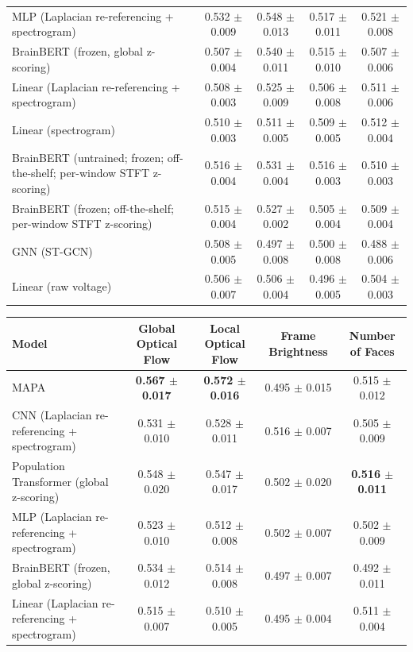 \begin{table}[!htbp]
\begin{tabular}{>{\raggedright\arraybackslash}p{8cm}cccc}
MLP (Laplacian re-referencing + spectrogram) & 0.532 $\pm$ 0.009 & 0.548 $\pm$ 0.013 & 0.517 $\pm$ 0.011 & 0.521 $\pm$ 0.008 \\
BrainBERT (frozen, global z-scoring) & 0.507 $\pm$ 0.004 & 0.540 $\pm$ 0.011 & 0.515 $\pm$ 0.010 & 0.507 $\pm$ 0.006 \\
Linear (Laplacian re-referencing + spectrogram) & 0.508 $\pm$ 0.003 & 0.525 $\pm$ 0.009 & 0.506 $\pm$ 0.008 & 0.511 $\pm$ 0.006 \\
Linear (spectrogram) & 0.510 $\pm$ 0.003 & 0.511 $\pm$ 0.005 & 0.509 $\pm$ 0.005 & 0.512 $\pm$ 0.004 \\
BrainBERT (untrained; frozen; off-the-shelf; per-window STFT z-scoring) & 0.516 $\pm$ 0.004 & 0.531 $\pm$ 0.004 & 0.516 $\pm$ 0.003 & 0.510 $\pm$ 0.003 \\
BrainBERT (frozen; off-the-shelf; per-window STFT z-scoring) & 0.515 $\pm$ 0.004 & 0.527 $\pm$ 0.002 & 0.505 $\pm$ 0.004 & 0.509 $\pm$ 0.004 \\
GNN (ST-GCN) & 0.508 $\pm$ 0.005 & 0.497 $\pm$ 0.008 & 0.500 $\pm$ 0.008 & 0.488 $\pm$ 0.006 \\
Linear (raw voltage) & 0.506 $\pm$ 0.007 & 0.506 $\pm$ 0.004 & 0.496 $\pm$ 0.005 & 0.504 $\pm$ 0.003 \\
\hline
\end{tabular}
\hspace{1em}
\hspace*{-2.5cm}\begin{tabular}{>{\raggedright\arraybackslash}p{8cm}cccc}
\hline
Model & Global Optical Flow & Local Optical Flow & Frame Brightness & Number of Faces \\
\hline
MAPA & \textbf{0.567 $\pm$ 0.017} & \textbf{0.572 $\pm$ 0.016} & 0.495 $\pm$ 0.015 & 0.515 $\pm$ 0.012 \\
CNN (Laplacian re-referencing + spectrogram) & 0.531 $\pm$ 0.010 & 0.528 $\pm$ 0.011 & 0.516 $\pm$ 0.007 & 0.505 $\pm$ 0.009 \\
Population Transformer (global z-scoring) & 0.548 $\pm$ 0.020 & 0.547 $\pm$ 0.017 & 0.502 $\pm$ 0.020 & \textbf{0.516 $\pm$ 0.011} \\
MLP (Laplacian re-referencing + spectrogram) & 0.523 $\pm$ 0.010 & 0.512 $\pm$ 0.008 & 0.502 $\pm$ 0.007 & 0.502 $\pm$ 0.009 \\
BrainBERT (frozen, global z-scoring) & 0.534 $\pm$ 0.012 & 0.514 $\pm$ 0.008 & 0.497 $\pm$ 0.007 & 0.492 $\pm$ 0.011 \\
Linear (Laplacian re-referencing + spectrogram) & 0.515 $\pm$ 0.007 & 0.510 $\pm$ 0.005 & 0.495 $\pm$ 0.004 & 0.511 $\pm$ 0.004 \\

\end{tabular}
\end{table}
